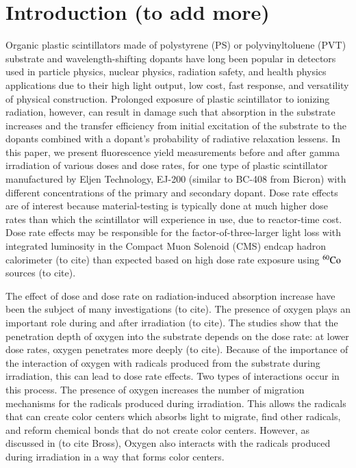 \documentclass[preprint,12pt]{elsarticle}
\begin{document}

\section{Introduction (to add more)}
Organic plastic scintillators made of polystyrene (PS) or polyvinyltoluene (PVT) substrate and wavelength-shifting dopants have 
long been popular in detectors used in particle physics, nuclear physics, radiation safety, and health physics applications 
due to their high light output, low cost, fast response, and versatility of physical construction. 
Prolonged exposure of plastic scintillator to ionizing radiation, however, can result in damage such that
absorption in the substrate increases and the transfer efficiency from initial excitation of the substrate to the dopants
combined with a dopant's probability of radiative relaxation lessens. 
In this paper, we present fluorescence yield measurements before and after gamma irradiation of various doses and 
dose rates, for one type of plastic scintillator manufactured by Eljen Technology, EJ-200 (similar to BC-408 from Bicron) 
with different concentrations of the primary and secondary dopant.
Dose rate effects are of interest because material-testing is typically done at much higher dose rates than 
which the scintillator will experience in use, due to reactor-time cost.
Dose rate effects may be responsible for the factor-of-three-larger light loss with integrated luminosity 
in the Compact Muon Solenoid (CMS) endcap hadron calorimeter (to cite) than expected based on high dose rate exposure 
using $\rm {^{60}Co}$ sources (to cite). 

The effect of dose and dose rate on radiation-induced absorption increase have been the subject of many investigations (to cite).
The presence of oxygen plays an important role during and after irradiation (to cite).
The studies show that the penetration depth of oxygen into the substrate depends on the dose rate: 
at lower dose rates, oxygen penetrates more deeply (to cite). 
Because of the importance of the interaction of oxygen with radicals produced from the substrate during irradiation, 
this can lead to dose rate effects. Two types of interactions occur in this process. 
The presence of oxygen increases the number of migration mechanisms for the radicals produced during irradiation. 
This allows the radicals that can create color centers which absorbs light to migrate, find other radicals, 
and reform chemical bonds that do not create color centers.
However, as discussed in (to cite Bross), Oxygen also interacts with the radicals produced during irradiation in a way 
that forms color centers. 
\end{document}
